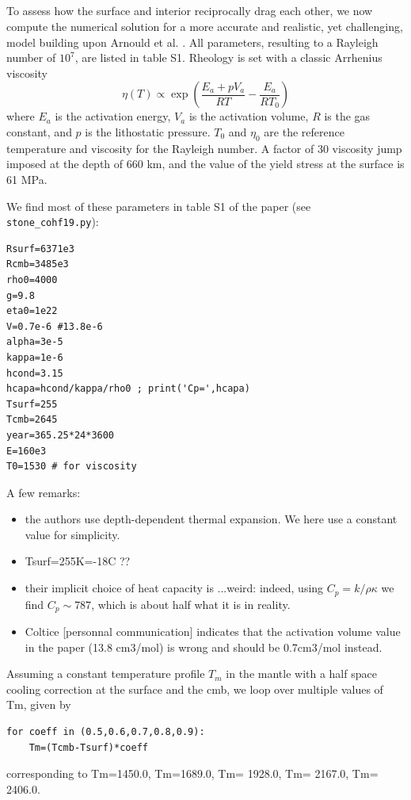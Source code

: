 \subsection*{\textcite{cohf19}}

\begin{displayquote}{\color{darkgray}
To assess how the surface and interior reciprocally drag each other, we
now compute the numerical solution for a more accurate and realistic,
yet challenging, model building upon Arnould et al. \cite{arcf18}. 
All parameters, resulting to a Rayleigh number of $10^7$, are listed in table S1.
Rheology is set with a classic Arrhenius viscosity
\[
\eta(T) \propto \exp \left(
\frac{E_a + p V_a}{RT} - \frac{E_a }{RT_0} 
\right)
\]
where $E_a$ is the activation energy, $V_a$ is the activation volume, 
$R$ is the gas constant, and $p$ is the lithostatic pressure. $T_0$ and 
$\eta_0$ are the reference temperature and viscosity for the Rayleigh number. 
A factor of 30 viscosity jump imposed at the depth of 660 km, and the value of
the yield stress at the surface is 61 MPa.}
\end{displayquote}

We find most of these parameters in table S1 of the paper (see {\tt stone\_cohf19.py}):
\begin{lstlisting}
Rsurf=6371e3
Rcmb=3485e3
rho0=4000
g=9.8
eta0=1e22
V=0.7e-6 #13.8e-6
alpha=3e-5
kappa=1e-6
hcond=3.15
hcapa=hcond/kappa/rho0 ; print('Cp=',hcapa)
Tsurf=255
Tcmb=2645
year=365.25*24*3600
E=160e3
T0=1530 # for viscosity 
\end{lstlisting}

A few remarks:
\begin{itemize}
\item the authors use depth-dependent thermal expansion. We here use
a constant value for simplicity.
\item Tsurf=255K=-18C ??
\item their implicit choice of heat capacity is ...weird: indeed, using $C_p = k/\rho \kappa$
we find $C_p \sim 787$, which is about half what it is in reality.
\item Coltice [personnal communication] indicates that the activation 
volume value in the paper (13.8 cm3/mol) is wrong and should be 0.7cm3/mol instead.
\end{itemize}

Assuming a constant temperature profile $T_m$ in the mantle 
with a half space cooling correction at the surface and the cmb,
we loop over multiple values of Tm, given by 
\begin{lstlisting}
for coeff in (0.5,0.6,0.7,0.8,0.9):
    Tm=(Tcmb-Tsurf)*coeff 
\end{lstlisting}
corresponding to 
Tm=1450.0,
Tm=1689.0,
Tm= 1928.0,
Tm= 2167.0,
Tm= 2406.0.



